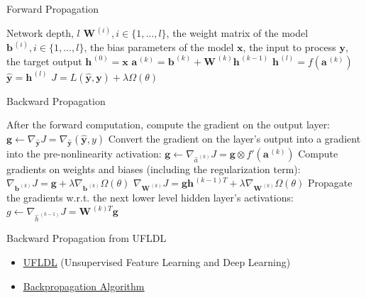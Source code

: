 \documentclass[10pt]{beamer}
\begin{document}
	\begin{frame}{Forward Propagation}
		\begin{algorithm}[H]
			\caption{Forward Propagation}  
			\label{alg:forward-prop}  
			\begin{algorithmic} 
				\REQUIRE Network depth, $l$
				\REQUIRE $\bm{W}^{\,(i)},i\in\{1,\dots,l\}$, the weight matrix of the model
				\REQUIRE $\bm{b}^{\,(i)},i\in\{1,\dots,l\}$, the bias parameters of the model
				\REQUIRE $\bm{x}$, the input to process
				\REQUIRE $\bm{y}$, the target output
				\STATE $\bm{h}^{\,(0)}=\bm{x}$
					\STATE $\bm{a}^{\,(k)}=\bm{b}^{\,(k)}+\bm{W}^{\,(k)}\bm{h}^{\,(k-1)}$
					\STATE $\bm{h}^{\,(l)}=f(\bm{a}^{\,(k)})$
				\ENDFOR
				\STATE $\hat{\bm{y}}=\bm{h}^{\,(l)}$
				\STATE $J=L(\hat{\bm{y}},\bm{y})+\lambda\Omega(\theta)$
			\end{algorithmic}  
		\end{algorithm}  
	\end{frame}

	\begin{frame}{Backward Propagation}
		\begin{algorithm}[H]
			\caption{Backward computation}
			\label{alg:backward-prop}
			\begin{algorithmic}
				\STATE After the forward computation, compute the gradient on the output layer:
				\STATE $\bm{g}\leftarrow\nabla_{\hat{\bm{y}}}J=\nabla_{\hat{\bm{y}}}(\hat{\bm{y}},y)$
				\FOR{$k=l,l-1,\dots,1$}
					\STATE Convert the gradient on the layer's output into a gradient into the pre-nonlinearity activation:
					\STATE $\bm{g}\leftarrow\nabla_{\hat{a}^{\,(k)}}J=\bm{g}\otimes f'(\bm{a}^{\,(k)})$
					\STATE Compute gradients on weights and biases (including the regularization term):
					\STATE $\nabla_{\bm{b}^{\,(k)}}J=\bm{g}+\lambda\nabla_{\bm{b}^{\,(k)}}\Omega(\theta)$
					\STATE $\nabla_{\bm{W}^{\,(k)}}J=\bm{g}\bm{h}^{\,(k-1)T}+\lambda\nabla_{\bm{W}^{\,(k)}}\Omega(\theta)$
					\STATE Propagate the gradients w.r.t. the next lower level hidden layer's activations:
					\STATE $g\leftarrow\nabla_{\hat{h}^{\,(k-1)}}J=\bm{W}^{\,(k)T}\bm{g}$
				\ENDFOR
			\end{algorithmic}
		\end{algorithm}
	\end{frame}

	\begin{frame}{Backward Propagation from UFLDL}
		\begin{itemize}
			\item
			\href{http://ufldl.stanford.edu/wiki/index.php/UFLDL_Tutorial}{\underline{UFLDL}} (Unsupervised Feature Learning and Deep Learning)
			\item\href{http://ufldl.stanford.edu/wiki/index.php/Backpropagation_Algorithm}{\underline{Backpropagation Algorithm}}
		\end{itemize}
	\end{frame}
\end{document}
